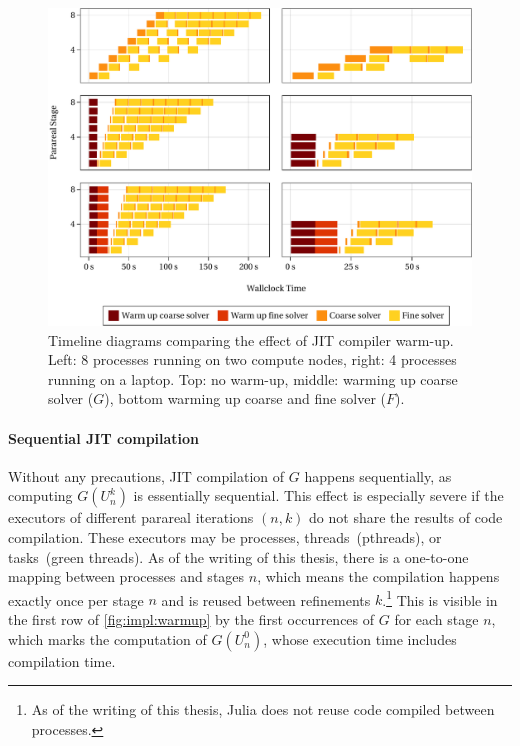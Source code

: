 \begin{figure}[htb]
  \includegraphics[width=\textwidth]{figures/fig_impl_warmup2.pdf}
  \caption[Timeline diagrams comparing the effect of JIT compiler warm-up.]{%
    Timeline diagrams comparing the effect of \acs{JIT} compiler warm-up.
    Left: 8 processes running on two compute nodes,
    right: 4 processes running on a laptop.
    Top: no warm-up,
    middle: warming up coarse solver  ($G$),
    bottom warming up coarse and fine solver  ($F$).
  }
  \label{fig:impl:warmup}
\end{figure}

\paragraph{Sequential \ac{JIT} compilation}

Without any precautions,
\ac{JIT} compilation of $G$ happens sequentially,
as computing $G(U_n^k)$ is essentially sequential.
This effect is especially severe if the executors of different parareal iterations $(n,k)$ do not share the results of code compilation.
These executors may be processes, threads~(pthreads), or tasks~(green threads).
As of the writing of this thesis,
there is a one-to-one mapping between processes and stages $n$,
which means the compilation happens exactly once per stage $n$ and is reused between refinements $k$.\footnote{%
  As of the writing of this thesis, Julia does not reuse code compiled between processes.
}
This is visible in the first row of \autoref{fig:impl:warmup}
by the first occurrences of $G$ for each stage $n$,
which marks the computation of $G(U_n^0)$,
whose execution time includes compilation time.

